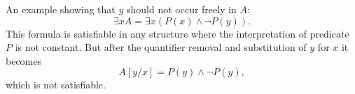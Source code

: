 

\setcounter{section}{2}
\setcounter{subsection}{1}
\setcounter{dfn}{3}


An example showing that $y$ should not occur freely in $A$:
\[
\exists x A = \exists x (P(x) \wedge \neg P(y)).
\]
This formula is satisfiable in any structure where the interpretation of predicate $P$ is not constant.
But after the quantifier removal and substitution of $y$ for $x$ it becomes
\[
A[y/x] = P(y) \wedge \neg P(y),
\]
which is not satisfiable.









